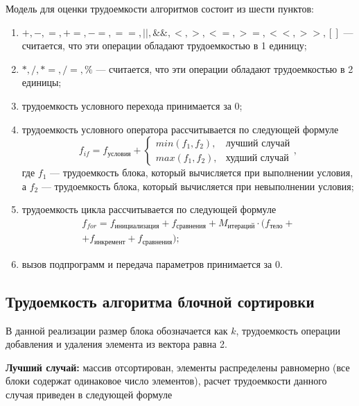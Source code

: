 Модель для оценки трудоемкости алгоритмов состоит из шести пунктов:
\begin{enumerate}
	\item $+, -, =, +=, -=, ==, ||, \&\&, <, >, <=, >=, <<, >>, []$ --- считается, что эти операции обладают трудоемкостью в 1 единицу;
	\item $*, /, *=, /=, \% $ --- считается, что эти операции обладают трудоемкостью в 2 единицы;
	\item трудоемкость условного перехода принимается за $0$;
	\item трудоемкость условного оператора рассчитывается по следующей формуле
	\begin{equation}
		\label{eq:if}
		f_{if} = f_{\text{условия}} + 
		\begin{cases}
			min(f_1, f_2), & \text{лучший случай}\\
			max(f_1, f_2), & \text{худший случай}
		\end{cases},
	\end{equation}
	где $f_1$ --- трудоемкость блока, который вычисляется при выполнении условия, а $f_2$ --- трудоемкость блока, который вычисляется при невыполнении условия;
	\item трудоемкость цикла рассчитывается по следующей формуле
	\begin{equation}
		\label{eq:for}
		\begin{gathered}
			f_{for} = f_{\text{инициализация}} + f_{\text{сравнения}} + M_{\text{итераций}} \cdot (f_{\text{тело}} +\\
			+ f_{\text{инкремент}} + f_{\text{сравнения}});
		\end{gathered}
	\end{equation}
	\item вызов подпрограмм и передача параметров принимается за $0$.
\end{enumerate}

\subsection{Трудоемкость алгоритма блочной сортировки}

В данной реализации размер блока обозначается как $k$, трудоемкость операции добавления и удаления элемента из вектора равна 2.


\textbf{Лучший случай:} массив отсортирован, элементы распределены равномерно (все блоки содержат одинаковое число элементов), расчет трудоемкости данного случая приведен в следующей формуле

